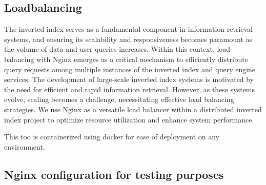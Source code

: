 \documentclass{article}
\begin{document}
\subsection{Loadbalancing}
The inverted index serves as a fundamental component in information retrieval systems, and ensuring its scalability and responsiveness becomes paramount as the volume of data and user queries increases. Within this context, load balancing with Nginx emerges as a critical mechanism to efficiently distribute query requests among multiple instances of the inverted index and query engine services. The development of large-scale inverted index systems is motivated by the need for efficient and rapid information retrieval. However, as these systems evolve, scaling becomes a challenge, necessitating effective load balancing strategies. 
We use Nginx as a versatile load balancer within a distributed inverted index project to optimize resource utilization and enhance system performance.

This too is containerized using docker for ease of deployment on any environment.
\subsection{Nginx configuration for testing purposes}
\end{document}
